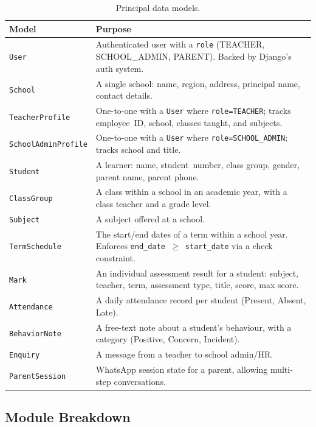 \documentclass[11pt,a4paper]{article}
\begin{document}
\begin{table}[h]
\centering
\caption{Principal data models.}
\label{tab:models}
\renewcommand{\arraystretch}{1.25}
\begin{tabular}{p{3.0cm} p{11.5cm}}
\toprule
\textbf{Model} & \textbf{Purpose} \\
\midrule
\texttt{User}              & Authenticated user with a \texttt{role} (TEACHER, SCHOOL\_ADMIN, PARENT). Backed by Django's auth system. \\
\texttt{School}            & A single school: name, region, address, principal name, contact details. \\
\texttt{TeacherProfile}    & One-to-one with a \texttt{User} where \texttt{role=TEACHER}; tracks employee~ID, school, classes taught, and subjects. \\
\texttt{SchoolAdminProfile}& One-to-one with a \texttt{User} where \texttt{role=SCHOOL\_ADMIN}; tracks school and title. \\
\texttt{Student}           & A learner: name, student~number, class group, gender, parent name, parent phone. \\
\texttt{ClassGroup}        & A class within a school in an academic year, with a class teacher and a grade level. \\
\texttt{Subject}           & A subject offered at a school. \\
\texttt{TermSchedule}      & The start/end dates of a term within a school year. Enforces \texttt{end\_date $\geq$ start\_date} via a check constraint. \\
\texttt{Mark}              & An individual assessment result for a student: subject, teacher, term, assessment type, title, score, max score. \\
\texttt{Attendance}        & A daily attendance record per student (Present, Absent, Late). \\
\texttt{BehaviorNote}      & A free-text note about a student's behaviour, with a category (Positive, Concern, Incident). \\
\texttt{Enquiry}           & A message from a teacher to school admin/HR. \\
\texttt{ParentSession}     & WhatsApp session state for a parent, allowing multi-step conversations. \\
\bottomrule
\end{tabular}
\end{table}

\subsection{Module Breakdown}
\end{document}
